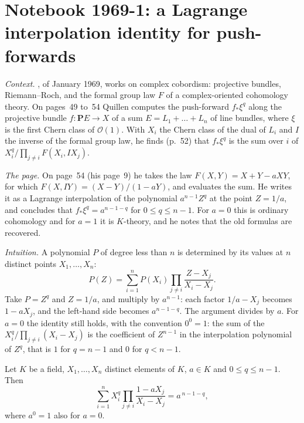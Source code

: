 \section[Notebook 1969-1: a Lagrange identity for push-forwards]{Notebook 1969-1: a Lagrange interpolation identity for push-forwards\protect{}}\label{sec:quillen-1969-1}

\emph{Context.} , of January 1969, works on complex cobordism: projective bundles, Riemann--Roch, and the formal group law $F$ of a complex-oriented cohomology theory. On pages~49 to~54 Quillen computes the push-forward $f_*\xi^q$ along the projective bundle $f : \mathbf P E \to X$ of a sum $E = L_1 + \dots + L_n$ of line bundles, where $\xi$ is the first Chern class of $\mathcal O(1)$. With $X_i$ the Chern class of the dual of $L_i$ and $I$ the inverse of the formal group law, he finds (p.~52) that $f_*\xi^q$ is the sum over $i$ of $X_i^q / \prod_{j \ne i} F(X_i, IX_j)$.

\emph{The page.} On page~54 (his page~9) he takes the law $F(X, Y) = X + Y - aXY$, for which $F(X, IY) = (X - Y)/(1 - aY)$, and evaluates the sum. He writes it as a Lagrange interpolation of the polynomial $a^{n-1}Z^q$ at the point $Z = 1/a$, and concludes that $f_*\xi^q = a^{n-1-q}$ for $0 \le q \le n - 1$. For $a = 0$ this is ordinary cohomology and for $a = 1$ it is $K$-theory, and he notes that the old formulas are recovered.

\emph{Intuition.} A polynomial $P$ of degree less than $n$ is determined by its values at $n$ distinct points $X_1, \dots, X_n$:
\[
  P(Z) = \sum_{i=1}^n P(X_i) \prod_{j \ne i} \frac{Z - X_j}{X_i - X_j}.
\]
Take $P = Z^q$ and $Z = 1/a$, and multiply by $a^{n-1}$: each factor $1/a - X_j$ becomes $1 - aX_j$, and the left-hand side becomes $a^{n-1-q}$. The argument divides by $a$. For $a = 0$ the identity still holds, with the convention $0^0 = 1$: the sum of the $X_i^q / \prod_{j \ne i}(X_i - X_j)$ is the coefficient of $Z^{n-1}$ in the interpolation polynomial of $Z^q$, that is $1$ for $q = n - 1$ and $0$ for $q < n - 1$.

\begin{encadre}
\begin{theoreme}\label{thm:quillen-1969-1}
Let $K$ be a field, $X_1, \dots, X_n$ distinct elements of $K$, $a \in K$ and $0 \le q \le n - 1$. Then
\[
  \sum_{i=1}^n X_i^q \prod_{j \ne i} \frac{1 - aX_j}{X_i - X_j} = a^{\,n-1-q},
\]
where $a^0 = 1$ also for $a = 0$.
\end{theoreme}
\end{encadre}

